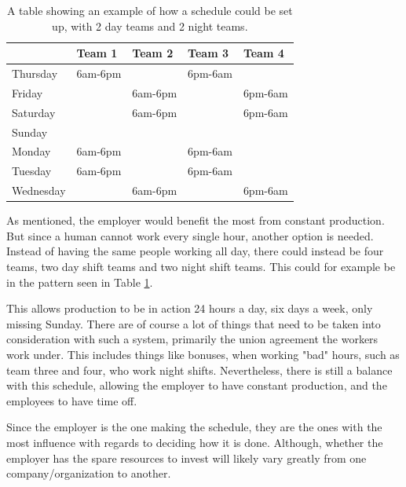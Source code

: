 \begin{table}[ht!]
    \centering
    \begin{tabular}{lllll}
        \toprule
                  & Team 1  & Team 2  & Team 3  & Team 4  \\
                  \midrule
        Thursday  & 6am-6pm &         & 6pm-6am &         \\
        Friday    &         & 6am-6pm &         & 6pm-6am \\
        Saturday  &         & 6am-6pm &         & 6pm-6am \\
        Sunday    &         &         &         &         \\
        Monday    & 6am-6pm &         & 6pm-6am &         \\
        Tuesday   & 6am-6pm &         & 6pm-6am &         \\
        Wednesday &         & 6am-6pm &         & 6pm-6am \\
        \bottomrule
    \end{tabular}
    \caption{A table showing an example of how a schedule could be set up, with 2 day teams and 2 night teams.}
    \label{tab:exampleSchedule}
\end{table}

As mentioned, the employer would benefit the most from constant production. But since a human cannot work every single hour, another option is needed. Instead of having the same people working all day, there could instead be four teams, two day shift teams and two night shift teams. This could for example be in the pattern seen in Table \ref{tab:exampleSchedule}.

This allows production to be in action 24 hours a day, six days a week, only missing Sunday. There are of course a lot of things that need to be taken into consideration with such a system, primarily the union agreement the workers work under. This includes things like bonuses, when working "bad" hours, such as team three and four, who work night shifts. Nevertheless, there is still a balance with this schedule, allowing the employer to have constant production, and the employees to have time off.

Since the employer is the one making the schedule, they are the ones with the most influence with regards to deciding how it is done. Although, whether the employer has the spare resources to invest will likely vary greatly from one company/organization to another.


